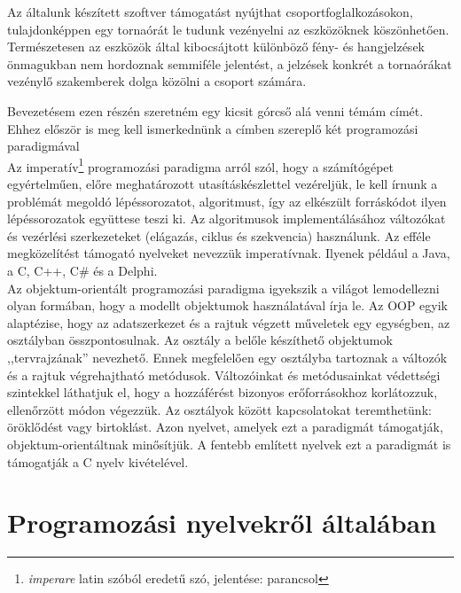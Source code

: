 \documentclass[tocnopagenum]{thesis-ekf}
\theoremstyle{definition}
\theoremstyle{remark}
\begin{document}
	Az általunk készített szoftver támogatást nyújthat csoportfoglalkozásokon, tulajdonképpen egy tornaórát le tudunk vezényelni az eszközöknek köszönhetően. Természetesen az eszközök által kibocsájtott különböző fény- és hangjelzések önmagukban nem hordoznak semmiféle jelentést, a jelzések konkrét  a tornaórákat vezénylő szakemberek dolga közölni a csoport számára.
	
	Bevezetésem ezen részén szeretném egy kicsit górcső alá venni témám címét. Ehhez először is meg kell ismerkednünk a címben szereplő két programozási paradigmával\\
 	Az imperatív\footnote{\textit{imperare} latin szóból eredetű szó, jelentése: parancsol} programozási paradigma arról szól, hogy a számítógépet egyértelműen, előre meghatározott utasításkészlettel vezéreljük, le kell írnunk a problémát megoldó lépéssorozatot, algoritmust, így az elkészült forráskódot ilyen lépéssorozatok együttese teszi ki. Az algoritmusok implementálásához változókat és vezérlési szerkezeteket (elágazás, ciklus és szekvencia) használunk. Az efféle megközelítést támogató nyelveket nevezzük imperatívnak. Ilyenek például a Java, a C, C++, C\# és a Delphi.
 	\\
 	Az objektum-orientált programozási paradigma igyekszik a világot lemodellezni olyan formában, hogy a modellt objektumok használatával írja le. Az OOP egyik alaptézise, hogy az adatszerkezet és a rajtuk végzett műveletek egy egységben, az osztályban összpontosulnak. Az osztály a belőle készíthető objektumok ,,tervrajzának'' nevezhető. Ennek megfelelően egy osztályba tartoznak a változók és a rajtuk végrehajtható metódusok. Változóinkat és metódusainkat védettségi szintekkel láthatjuk el, hogy a hozzáférést bizonyos erőforrásokhoz korlátozzuk, ellenőrzött módon végezzük. Az osztályok között kapcsolatokat teremthetünk: öröklődést vagy birtoklást. Azon nyelvet, amelyek ezt a paradigmát támogatják, objektum-orientáltnak minősítjük.
 	A fentebb említett nyelvek ezt a paradigmát is támogatják a C nyelv kivételével.
	\chapter{Programozási nyelvekről általában}
\end{document}
